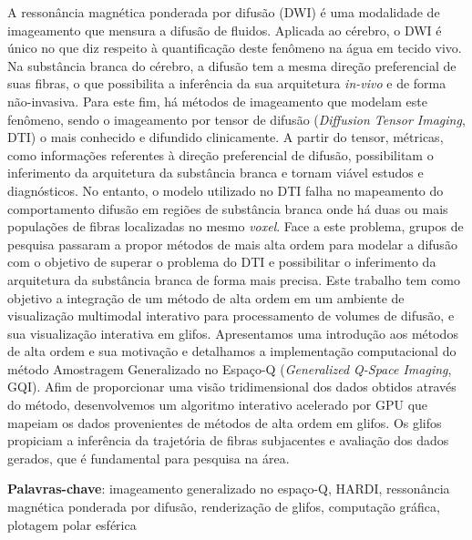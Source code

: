 \documentclass[
    12pt,                %
    oneside,            %
    a4paper,            %
    english,            %
    french,                %
    spanish,            %
    brazil                %
    ]{abntex2}
\begin{document}
\setlength{\absparsep}{18pt} %
\begin{resumo}

A ressonância magnética ponderada por difusão (DWI) é uma modalidade de imageamento que mensura a difusão de fluidos. Aplicada ao cérebro, o DWI é único no que diz respeito à quantificação deste fenômeno na água em tecido vivo. Na substância branca do cérebro, a difusão tem a mesma direção preferencial de suas fibras, o que possibilita a inferência da sua arquitetura \textit{in-vivo} e de forma não-invasiva. Para este fim, há métodos de imageamento que modelam este fenômeno, sendo o imageamento por tensor de difusão (\textit{Diffusion Tensor Imaging}, DTI) o mais conhecido e difundido clinicamente. A partir do tensor, métricas, como informações referentes à direção preferencial de difusão, possibilitam o inferimento da arquitetura da substância branca e tornam viável estudos e diagnósticos. No entanto, o modelo utilizado no DTI falha no mapeamento do comportamento difusão em regiões de substância branca onde há duas ou mais populações de fibras localizadas no mesmo \textit{voxel}. Face a este problema, grupos de pesquisa passaram a propor métodos de mais alta ordem para modelar a difusão com o objetivo de superar o problema do DTI e possibilitar o inferimento da arquitetura da substância branca de forma mais precisa. Este trabalho tem como objetivo a integração de um método de alta ordem em um ambiente de visualização multimodal interativo para processamento de volumes de difusão, e sua visualização interativa em glifos. Apresentamos uma introdução aos métodos de alta ordem e sua motivação e detalhamos a implementação computacional do método Amostragem Generalizado no Espaço-Q (\textit{Generalized Q-Space Imaging}, GQI). Afim de proporcionar uma visão tridimensional dos dados obtidos através do método, desenvolvemos um algoritmo interativo acelerado por GPU que mapeiam os dados provenientes de métodos de alta ordem em glifos. Os glifos propiciam a inferência da trajetória de fibras subjacentes e avaliação dos dados gerados, que é fundamental para pesquisa na área.


\vspace{\onelineskip}
\noindent\textbf{Palavras-chave}: imageamento generalizado no espaço-Q, HARDI, ressonância magnética ponderada por difusão, renderização de glifos, computação gráfica, plotagem polar esférica
\end{resumo}
\pagebreak
%
\end{document}

